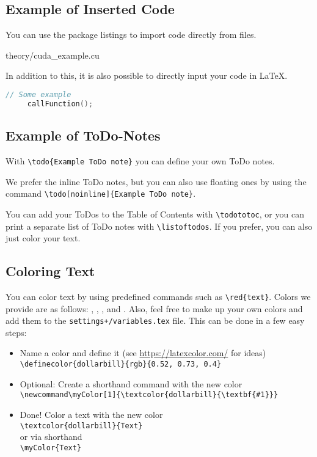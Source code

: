 \documentclass[class=scrbook, crop=false]{standalone}
\begin{document}
    \subsection{Example of Inserted Code}
    \label{Section::Insert_Code}
    You can use the package listings to import code directly from files. 
    
    {theory/cuda_example.cu}

    In addition to this, it is also possible to directly input your code in \LaTeX.
    \begin{lstlisting}[language=C++,
                       caption=Another Descriptive Caption Text,
                       label=Code:Super Code2]
     // Some example
     callFunction();
    \end{lstlisting}

    \subsection{Example of ToDo-Notes}
    \label{Section::ToDo}
    With \verb|\todo{Example ToDo note}| you can define your own ToDo notes.

    We prefer the inline ToDo notes, but you can also use floating ones by using the command \verb|\todo[noinline]{Example ToDo note}|.

    You can add your ToDos to the Table of Contents with \verb|\todototoc|, or you can print a separate list of ToDo notes with \verb|\listoftodos|.
    If you prefer, you can also just color your text.

    \subsection{Coloring Text}
    \label{Section::Colors}
    You can color text by using predefined commands such as \verb|\red{text}|.
    Colors we provide are as follows: , , , and . Also, feel free to make up your own colors and add them to the \verb|settings+/variables.tex| file. This can be done in a few easy steps:
    \begin{itemize}
        \item Name a color and define it (see \url{https://latexcolor.com/} for ideas)\\
              \verb|\definecolor{dollarbill}{rgb}{0.52, 0.73, 0.4}|
        \item Optional: Create a shorthand command with the new color\\
              \verb|\newcommand\myColor[1]{\textcolor{dollarbill}{\textbf{#1}}}|
        \item Done! Color a text with the new color\\
              \verb|\textcolor{dollarbill}{Text}|\\
              or via shorthand\\
              \verb|\myColor{Text}|
    \end{itemize}
\end{document}
